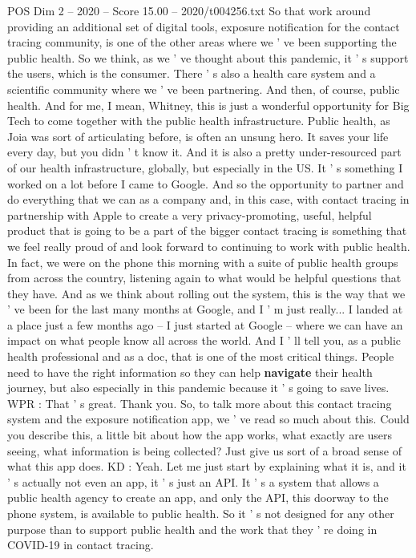 \begin{textsample}{POS Dim 2 – 2020 – Score 15.00 – 2020/t004256.txt}
So that work around providing an additional set of digital tools, exposure notification for the contact tracing community, is one of the other areas where we ' ve been supporting the public health.
So we think, as we ' ve thought about this pandemic, it ' s support the users, which is the consumer.
There ' s also a health care system and a scientific community where we ' ve been partnering.
And then, of course, public health.
And for me, I mean, Whitney, this is just a wonderful opportunity for Big Tech to come together with the public health infrastructure.
Public health, as Joia was sort of articulating before, is often an unsung hero.
It saves your life every day, but you didn ' t know it.
And it is also a pretty under-resourced part of our health infrastructure, globally, but especially in the US.
It ' s something I worked on a lot before I came to Google.
And so the opportunity to partner and do everything that we can as a company and, in this case, with contact tracing in partnership with Apple to create a very privacy-promoting, useful, helpful product that is going to be a part of the bigger contact tracing is something that we feel really proud of and look forward to continuing to work with public health.
In fact, we were on the phone this morning with a suite of public health groups from across the country, listening again to what would be helpful questions that they have.
And as we think about rolling out the system, this is the way that we ' ve been for the last many months at Google, and I ' m just really...
I landed at a place just a few months ago -- I just started at Google -- where we can have an impact on what people know all across the world.
And I ' ll tell you, as a public health professional and as a doc, that is one of the most critical things.
People need to have the right information so they can help \textbf{navigate} their health journey, but also especially in this pandemic because it ' s going to save lives.
WPR : That ' s great.
Thank you.
So, to talk more about this contact tracing system and the exposure notification app, we ' ve read so much about this.
Could you describe this, a little bit about how the app works, what exactly are users seeing, what information is being collected?
Just give us sort of a broad sense of what this app does.
KD : Yeah.
Let me just start by explaining what it is, and it ' s actually not even an app, it ' s just an API.
It ' s a system that allows a public health agency to create an app, and only the API, this doorway to the phone system, is available to public health.
So it ' s not designed for any other purpose than to support public health and the work that they ' re doing in COVID-19 in contact tracing.

\end{textsample}
